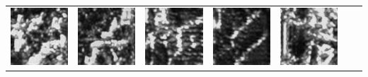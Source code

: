 \documentclass{article}
\begin{document}
\begin{table}[t]
	\centering
	\begin{tabular}{ccccccc}
			\includegraphics[scale=0.32]{Images/generated_data_80x80_upsampled/126000_00708.jpg}  & 
			\includegraphics[scale=0.32]{Images/generated_data_80x80_upsampled/126000_00734.jpg}  & 
			\includegraphics[scale=0.32]{Images/generated_data_80x80_upsampled/129000_00130.jpg}  & 
			\includegraphics[scale=0.32]{Images/generated_data_80x80_upsampled/129000_00141.jpg}  & 
			\includegraphics[scale=0.32]{Images/generated_data_80x80_upsampled/168000_00706.jpg}  &

\end{tabular}
\end{table}
\end{document}
